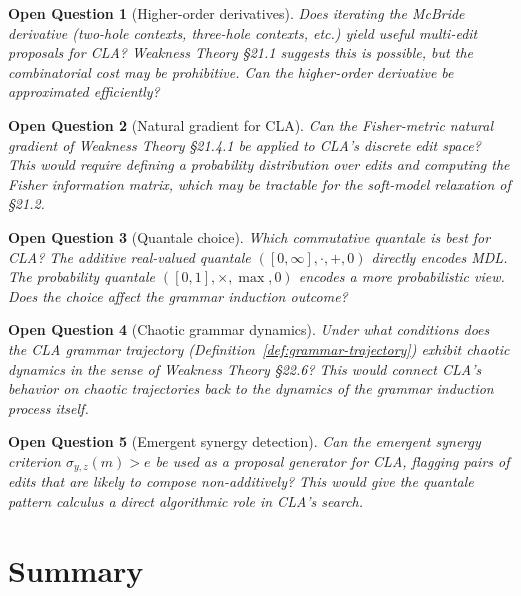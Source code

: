 \documentclass[11pt]{article}
\newtheorem{openquestion}{Open Question}
\begin{document}
\begin{openquestion}[Higher-order derivatives]
Does iterating the McBride derivative (two-hole contexts, three-hole contexts, etc.) yield useful multi-edit proposals for CLA?  Weakness Theory \S 21.1 suggests this is possible, but the combinatorial cost may be prohibitive.  Can the higher-order derivative be approximated efficiently?
\end{openquestion}

\begin{openquestion}[Natural gradient for CLA]
Can the Fisher-metric natural gradient of Weakness Theory \S 21.4.1 be applied to CLA's discrete edit space?  This would require defining a probability distribution over edits and computing the Fisher information matrix, which may be tractable for the soft-model relaxation of \S 21.2.
\end{openquestion}

\begin{openquestion}[Quantale choice]
Which commutative quantale is best for CLA?  The additive real-valued quantale $([0,\infty], \cdot, +, 0)$ directly encodes MDL.  The probability quantale $([0,1], \times, \max, 0)$ encodes a more probabilistic view.  Does the choice affect the grammar induction outcome?
\end{openquestion}

\begin{openquestion}[Chaotic grammar dynamics]
Under what conditions does the CLA grammar trajectory (Definition~\ref{def:grammar-trajectory}) exhibit chaotic dynamics in the sense of Weakness Theory \S 22.6?  This would connect CLA's behavior on chaotic trajectories back to the dynamics of the grammar induction process itself.
\end{openquestion}

\begin{openquestion}[Emergent synergy detection]
Can the emergent synergy criterion $\sigma_{y,z}(m) > e$ be used as a \emph{proposal generator} for CLA, flagging pairs of edits that are likely to compose non-additively?  This would give the quantale pattern calculus a direct algorithmic role in CLA's search.
\end{openquestion}

\section{Summary}
\end{document}
